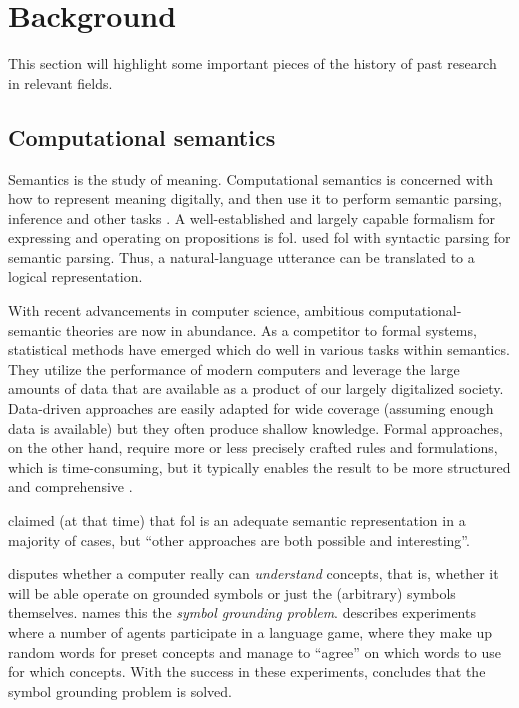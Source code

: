 \def\equationautorefname{equation}
\let\subsectionautorefname\sectionautorefname
\let\subsubsectionautorefname\sectionautorefname
\glsresetall
\section{Background}
\label{sec:background}

This section will highlight some important pieces of the history of past research in relevant fields.

\subsection{Computational semantics}

Semantics is the study of meaning.
Computational semantics is concerned with how to represent meaning digitally, and then use it to perform semantic parsing, inference and other tasks \citep{BlackburnComputationalsemantics2003}.
A well-established and largely capable formalism for expressing and operating on propositions is \gls{fol}.
\cite{MontagueFormalPhilosophySelected1974} used \gls{fol} with syntactic parsing for semantic parsing.
Thus, a natural-language utterance can be translated to a logical representation.

With recent advancements in computer science, ambitious computational-semantic theories are now in abundance.
As a competitor to formal systems, statistical methods have emerged which do well in various tasks within semantics.
They utilize the performance of modern computers and leverage the large amounts of data that are available as a product of our largely digitalized society.
Data-driven approaches are easily adapted for wide coverage (assuming enough data is available) but they often produce shallow knowledge.
Formal approaches, on the other hand, require more or less precisely crafted rules and formulations, which is time-consuming, but it typically enables the result to be more structured and comprehensive \citep{Dobnik:2017ag}.

\cite{BlackburnComputationalsemantics2003} claimed (at that time) that \gls{fol} is an adequate semantic representation in a majority of cases, but ``other approaches are both possible and interesting''.

\cite{SearleMindsbrainsprograms1980} disputes whether a computer really can \textit{understand} concepts, that is, whether it will be able operate on grounded symbols or just the (arbitrary) symbols themselves.
\cite{HarnadSymbolGroundingProblem1990} names this the \textit{symbol grounding problem}.
\cite{SteelsSymbolGroundingProblem2007} describes experiments where a number of agents participate in a language game, where they make up random words for preset concepts and manage to ``agree'' on which words to use for which concepts.
With the success in these experiments, \citeauthor{SteelsSymbolGroundingProblem2007} concludes that the symbol grounding problem is solved.



